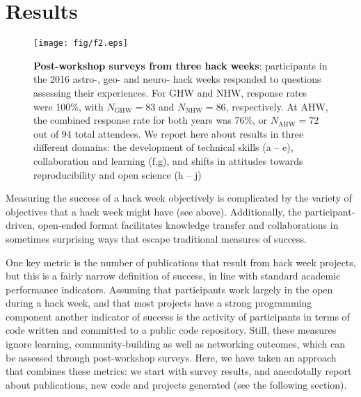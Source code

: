 \section*{Results}

\begin{figure*}[h!]
\centering
\texttt{[image: fig/f2.eps]}

\caption{{\bf Post-workshop surveys from three hack weeks}: participants in the 2016 astro-, geo- and neuro- hack weeks responded to questions assessing their experiences. For GHW and NHW, response rates were 100\%, with $N_{\mathrm{GHW}}= 83$ and $N_{\mathrm{NHW}} = 86$, respectively. At AHW, the combined response rate for both years was 76\%, or $N_{\mathrm{AHW}} = 72$ out of $94$ total attendees. We report here about results in three different domains: the development of technical skills (a -- e), collaboration and learning (f,g), and shifts in attitudes towards reproducibility and open science (h -- j)}
\label{fig:survey}
\end{figure*}

Measuring the success of a hack week objectively is complicated by the variety of objectives that a hack week might have (see above).
Additionally, the participant-driven, open-ended format facilitates knowledge transfer and collaborations in sometimes surprising ways that escape traditional measures of success.

One key metric is the number of publications that result from hack week projects, but this is a fairly narrow definition of success, in line with standard academic performance indicators.
Assuming that participants work largely in the open during a hack week, and that most projects have a strong programming component another indicator of success is the activity of participants in terms of code written and committed to a public code repository.
Still, these measures ignore learning, community-building as well as networking outcomes, which can be assessed through post-workshop surveys.
Here, we have taken an approach that combines these metrics: we start with survey results, and anecdotally report about publications, new code and projects generated (see the following section).

